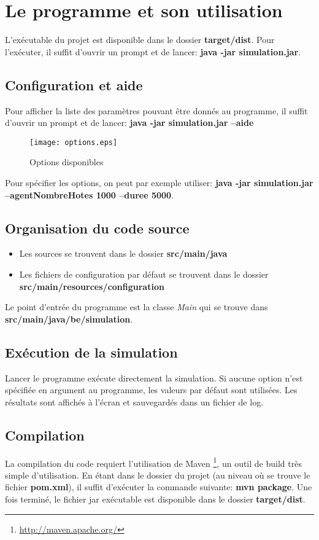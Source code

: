 \appendix

\section{Le programme et son utilisation}
L'exécutable du projet est disponible dans le dossier \textbf{target/dist}. Pour l'exécuter, il suffit d'ouvrir un prompt et de lancer: \textbf{java -jar simulation.jar}.

\subsection{Configuration et aide}
Pour afficher la liste des paramètres pouvant être donnés au programme, il suffit d'ouvrir un prompt et de lancer: \textbf{java -jar simulation.jar --aide}


\begin{figure}[h!t]
  \centering
    \texttt{[image: options.eps]}
  \caption{Options disponibles}
  \label{fig:options}
\end{figure}

Pour spécifier les options, on peut par exemple utiliser: \textbf{java -jar simulation.jar --agentNombreHotes 1000 --duree 5000}.

\subsection{Organisation du code source}
\begin{itemize}
 \item Les sources se trouvent dans le dossier \textbf{src/main/java}
 \item Les fichiers de configuration par défaut se trouvent dans le dossier \textbf{src/main/resources/configuration}
\end{itemize}

Le point d'entrée du programme est la classe \textit{Main} qui se trouve dans \textbf{src/main/java/be/simulation}.

\subsection{Exécution de la simulation}
Lancer le programme exécute directement la simulation. Si aucune option n'est spécifiée en argument au programme, les valeurs par défaut sont utilisées. Les résultats sont affichés à l'écran et sauvegardés dans un fichier de log.

\subsection{Compilation}
La compilation du code requiert l'utilisation de Maven \footnote{\url{http://maven.apache.org/}}, un outil de build très simple d'utilisation. En étant dans le dossier du projet (au niveau où se trouve le fichier \textbf{pom.xml}), il suffit d'exécuter la commande suivante: \textbf{mvn package}. Une fois terminé, le fichier jar exécutable est disponible dans le dossier \textbf{target/dist}.

